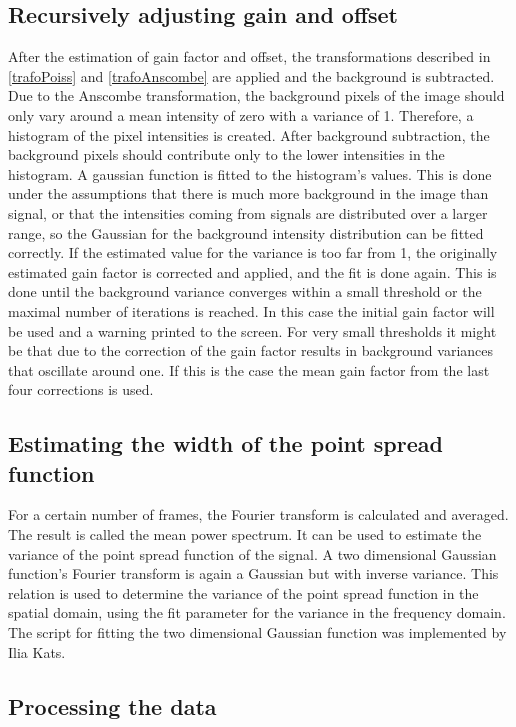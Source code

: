 \subsection{Recursively adjusting gain and offset}
After the estimation of gain factor and offset, the transformations described in \ref{trafoPoiss} and \ref{trafoAnscombe} are applied and the background is subtracted.\newline
Due to the Anscombe transformation, the background pixels of the image should only vary around a mean intensity of zero with a variance of 1. Therefore, a histogram of the pixel intensities is created. After background subtraction, the background pixels should contribute only to the lower intensities in the histogram. A gaussian function is fitted to the histogram's values. This is done under the assumptions that there is much more background in the image than signal, or that the intensities coming from signals are distributed over a larger range, so the Gaussian for the background intensity distribution can be fitted correctly.\newline
If the estimated value for the variance is too far from 1, the originally estimated gain factor is corrected and applied, and the fit is done again. This is done until the background variance converges within a small threshold or the maximal number of iterations is reached. In this case the initial gain factor will be used and a warning printed to the screen.\newline
For very small thresholds it might be that due to the correction of the gain factor results in background variances that oscillate around one. If this is the case the mean gain factor from the last four corrections is used.
\subsection{Estimating the width of the point spread function}
For a certain number of frames, the Fourier transform is calculated and averaged. The result is called the mean power spectrum. It can be used to estimate the variance of the point spread function of the signal. A two dimensional Gaussian function's Fourier transform is again a Gaussian but with inverse variance. This relation is used to determine the variance of the point spread function in the spatial domain, using the fit parameter for the variance in the frequency domain.\newline
The script for fitting the two dimensional Gaussian function was implemented by Ilia Kats.
\subsection{Processing the data}
